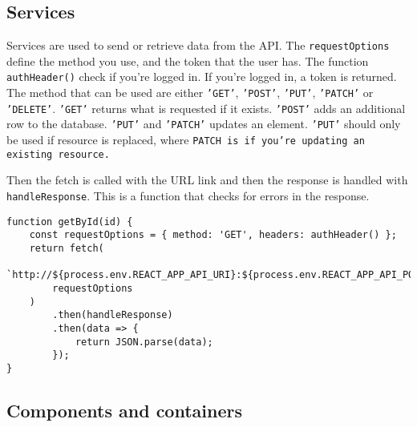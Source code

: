 \subsection{Services}
Services are used to send or retrieve data from the API. 
The \texttt{requestOptions} define the method you use, and the token that the user has.
The function \texttt{authHeader()} check if you're logged in. 
If you're logged in, a token is returned.
The method that can be used are either \texttt{'GET'}, \texttt{'POST'}, \texttt{'PUT'}, \texttt{'PATCH'} or \texttt{'DELETE'}.
\texttt{'GET'} returns what is requested if it exists.
\texttt{'POST'} adds an additional row to the database.
\texttt{'PUT'} and \texttt{'PATCH'} updates an element. 
\texttt{'PUT'} should only be used if resource is replaced, where \texttt{PATCH is if you're updating an existing resource.}

Then the fetch is called with the URL link and then the response is handled with \texttt{handleResponse}. 
This is a function that checks for errors in the response.

\begin{lstlisting}[caption={Function to get a user by ID.}, captionpos=b, label={material-ui}]
function getById(id) {
	const requestOptions = { method: 'GET', headers: authHeader() };
	return fetch(
		`http://${process.env.REACT_APP_API_URI}:${process.env.REACT_APP_API_PORT}/api/users/${id}`,
		requestOptions
	)
		.then(handleResponse)
		.then(data => {
			return JSON.parse(data);
		});
}
\end{lstlisting}


\subsection{Components and containers}


